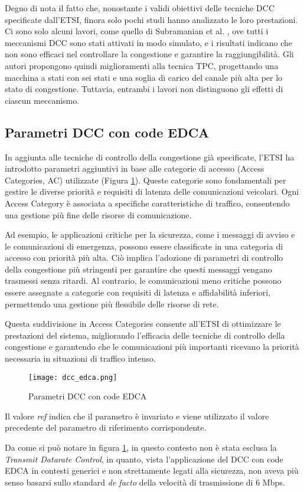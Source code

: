 Degno di nota il fatto che, nonostante i validi obiettivi delle tecniche DCC specificate dall'ETSI, finora solo pochi studi hanno analizzato le loro prestazioni. Ci sono solo alcuni lavori, come quello di Subramanian et al. \cite{subramanian2012congestion}, ove tutti i meccanismi DCC sono stati attivati in modo simulato, e i risultati indicano che non sono efficaci nel controllare la congestione e garantire la raggiungibilità. Gli autori propongono quindi miglioramenti alla tecnica TPC, progettando una macchina a stati con sei stati e una soglia di carico del canale più alta per lo stato di congestione. Tuttavia, entrambi i lavori non distinguono gli effetti di ciascun meccanismo.

\subsection[DCC con code EDCA]{Parametri DCC con code EDCA}

In aggiunta alle tecniche di controllo della congestione già specificate, l'ETSI ha introdotto parametri aggiuntivi in base alle categorie di accesso (Access Categories, AC) utilizzate \cite{etsi2011intelligent} (Figura \ref{fig:dcc_edca}). Queste categorie sono fondamentali per gestire le diverse priorità e requisiti di latenza delle comunicazioni veicolari. Ogni Access Category è associata a specifiche caratteristiche di traffico, consentendo una gestione più fine delle risorse di comunicazione.

Ad esempio, le applicazioni critiche per la sicurezza, come i messaggi di avviso e le comunicazioni di emergenza, possono essere classificate in una categoria di accesso con priorità più alta. Ciò implica l'adozione di parametri di controllo della congestione più stringenti per garantire che questi messaggi vengano trasmessi senza ritardi. Al contrario, le comunicazioni meno critiche possono essere assegnate a categorie con requisiti di latenza e affidabilità inferiori, permettendo una gestione più flessibile delle risorse di rete.

Questa suddivisione in Access Categories consente all'ETSI di ottimizzare le prestazioni del sistema, migliorando l'efficacia delle tecniche di controllo della congestione e garantendo che le comunicazioni più importanti ricevano la priorità necessaria in situazioni di traffico intenso.

\begin{figure}[h!]
    \centering
    \texttt{[image: dcc\_edca.png]}
    \caption{Parametri DCC con code EDCA}
    \label{fig:dcc_edca}
\end{figure}

Il valore \textit{ref} indica che il parametro è invariato e viene utilizzato il valore precedente del parametro di riferimento corrispondente.

Da come si può notare in figura \ref{fig:dcc_edca}, in questo contesto non è stata esclusa la \textit{Transmit Datarate Control}, in quanto, vista l'applicazione del DCC con code EDCA in contesti generici e non strettamente legati alla sicurezza, non aveva più senso basarsi sullo standard \textit{de facto} della velocità di trasmissione di 6 Mbps.
